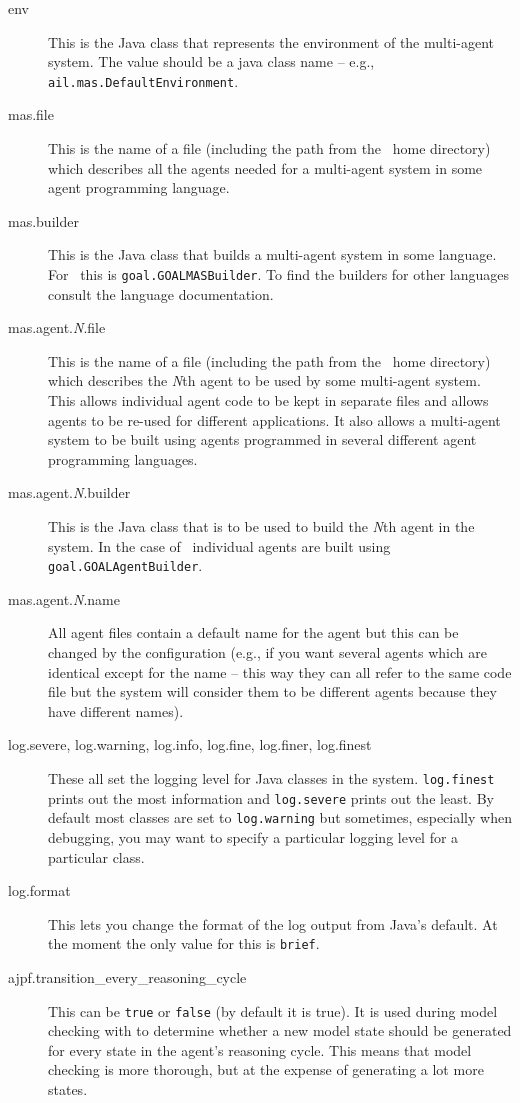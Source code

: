 \documentclass[a4]{article}
\begin{document}
\begin{description}
\item[env] This is the Java class that represents the environment of the multi-agent system.  The value should be a java class name -- e.g., \texttt{ail.mas.DefaultEnvironment}.
\item[mas.file] This is the name of a file (including the path from the \mcapl\ home directory) which describes all the agents needed for a multi-agent system in some agent programming language.
\item[mas.builder] This is the Java class that builds a multi-agent system in some language.  For \goal\ this is \texttt{goal.GOALMASBuilder}.  To find the builders for other languages consult the language documentation.
\item[mas.agent.\emph{N}.file] This is the name of a file (including the path from the \mcapl\ home directory) which describes the \emph{N}th agent to be used by some multi-agent system.  This allows individual agent code to be kept in separate files and allows agents to be re-used for different applications.  It also allows a multi-agent system to be built using agents programmed in several different agent programming languages.
\item[mas.agent.\emph{N}.builder] This is the Java class that is to be used to build the \emph{N}th agent in the system.  In the case of \goal\ individual agents are built using \texttt{goal.GOALAgentBuilder}. 
\item[mas.agent.\emph{N}.name] All agent files contain a default name for the agent but this can be changed by the configuration (e.g., if you want several agents which are identical except for the name -- this way they can all refer to the same code file but the system will consider them to be different agents because they have different names).
\item[log.severe, log.warning, log.info, log.fine, log.finer, log.finest] These all set the logging level for Java classes in the system.  \texttt{log.finest} prints out the most information and \texttt{log.severe} prints out the least.  By default most classes are set to \texttt{log.warning} but sometimes, especially when debugging, you may want to specify a particular logging level for a particular class. 
\item[log.format] This lets you change the format of the log output from Java's default.  At the moment the only value for this is \texttt{brief}.
\item[ajpf.transition\_every\_reasoning\_cycle] This can be \texttt{true} or \texttt{false} (by default it is true).  It is used during model checking with \ajpf{} to determine whether a new model state should be generated for every state in the agent's reasoning cycle.  This means that model checking is more thorough, but at the expense of generating a lot more states.

\end{description}
\end{document}
